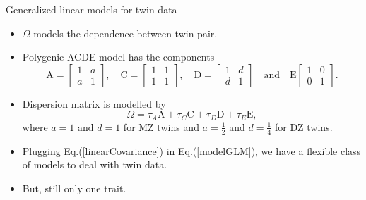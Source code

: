 \documentclass[
  ignorenonframetext,
  serif,
  professionalfont,
  usenames,
  dvipsnames,
  aspectratio = 169]{beamer}
\providecommand{\tightlist}{%
  \setlength{\itemsep}{0pt}\setlength{\parskip}{0pt}}
\renewcommand{\tightlist}{%
  \setlength{\itemsep}{0\baselineskip}
  \setlength{\parskip}{0.25\baselineskip}
}
\begin{document}
\begin{frame}{Generalized linear models for twin data}
\protect\hypertarget{generalized-linear-models-for-twin-data-2}{}
\begin{itemize}
\tightlist
\item
  \(\Omega\) models the dependence between twin pair.
\item
  Polygenic ACDE model has the components \begin{equation*}
  \label{components}
  \mathrm{A} = \begin{bmatrix}
  1 & a\\ 
  a & 1
  \end{bmatrix}, \quad
  \mathrm{C} = \begin{bmatrix}
  1 & 1\\ 
  1 & 1
  \end{bmatrix}, \quad
  \mathrm{D} = \begin{bmatrix}
  1 & d\\ 
  d & 1
  \end{bmatrix}\quad \text{and} \quad
  \mathrm{E} \begin{bmatrix}
  1 & 0\\ 
  0 & 1
  \end{bmatrix}.
  \end{equation*}
\item
  Dispersion matrix is modelled by \begin{equation}
  \label{linearCovariance}
  \Omega = \tau_A \mathrm{A} + \tau_C \mathrm{C} + \tau_D \mathrm{D} + \tau_E \mathrm{E},
  \end{equation} where \(a=1\) and \(d = 1\) for MZ twins and
  \(a=\frac{1}{2}\) and \(d = \frac{1}{4}\) for DZ twins.
\item
  Plugging Eq.(\ref{linearCovariance}) in Eq.(\ref{modelGLM}), we have a
  flexible class of models to deal with twin data.
\item
  But, still only one trait.
\end{itemize}
\end{frame}
\end{document}
